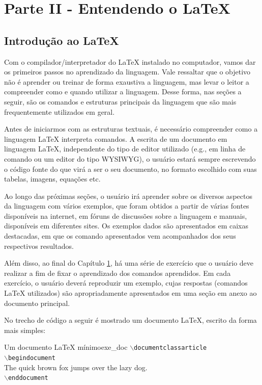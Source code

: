 \chapter{Parte II - Entendendo o \LaTeX{}}
\label{cap:parteII}

\section{Introdução ao \LaTeX{}}
\label{sec:intro_latex}

Com o compilador/interpretador do \LaTeX{} instalado no computador, vamos dar os primeiros passos no aprendizado da linguagem. Vale ressaltar que o objetivo não é aprender ou treinar de forma exaustiva a linguagem, mas levar o leitor a compreender como e quando utilizar a linguagem. Desse forma, nas seções a seguir, são os comandos e estruturas principais da linguagem que são mais frequentemente utilizados em geral.

Antes de iniciarmos com as estruturas textuais, é necessário compreender como a linguagem \LaTeX{} interpreta comandos. A escrita de um documento em linguagem \LaTeX{}, independente do tipo de editor utilizado (e.g., em linha de comando ou um editor do tipo WYSIWYG), o usuário estará sempre escrevendo o código fonte do que virá a ser o seu documento, no formato escolhido com suas tabelas, imagens, equações etc. 

Ao longo das próximas seções, o usuário irá aprender sobre os diversos aspectos da linguagem com vários exemplos, que foram obtidos a partir de várias fontes disponíveis na internet, em fóruns de discussões sobre a linguagem e manuais, disponíveis em diferentes sites. Os exemplos dados são apresentados em caixas destacadas, em que os comando apresentados vem acompanhados dos seus respectivos resultados.

Além disso, ao final do Capítulo \ref{cap:parteII}, há uma série de exercício que o usuário deve realizar a fim de fixar o aprendizado dos comandos aprendidos. Em cada exercício, o usuário deverá reproduzir um exemplo, cujas respostas (comandos LaTeX utilizados) são apropriadamente apresentados em uma seção em anexo ao documento principal.

No trecho de código a seguir é mostrado um documento \LaTeX{}, escrito da forma mais simples:


\begin{texexptitled}{Um documento LaTeX mínimo}{exe_doc}
$\backslash$\texttt{documentclass{article}}\\
$\backslash$\texttt{begin{document}}\\

The quick brown fox jumps over the lazy dog.\\

$\backslash$\texttt{end{document}}
\end{texexptitled}

